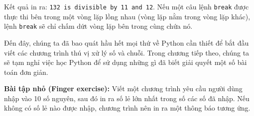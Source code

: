 Kết quả in ra: \texttt{132 is divisible by 11 and 12}. Nếu một câu lệnh \texttt{break} được thực thi bên trong một vòng lặp lồng nhau (vòng lặp nằm trong vòng lặp khác), lệnh \texttt{break} sẽ chỉ chấm dứt vòng lặp bên trong cùng chứa nó.

Đến đây, chúng ta đã bao quát hầu hết mọi thứ về Python cần thiết để bắt đầu viết các chương trình thú vị xử lý số và chuỗi. Trong chương tiếp theo, chúng ta sẽ tạm nghỉ việc học Python để sử dụng những gì đã biết giải quyết một số bài toán đơn giản.

\noindent \textbf{Bài tập nhỏ (Finger exercise):} Viết một chương trình yêu cầu người dùng nhập vào 10 số nguyên, sau đó in ra số lẻ lớn nhất trong số các số đã nhập. Nếu không có số lẻ nào được nhập, chương trình nên in ra một thông báo tương ứng.